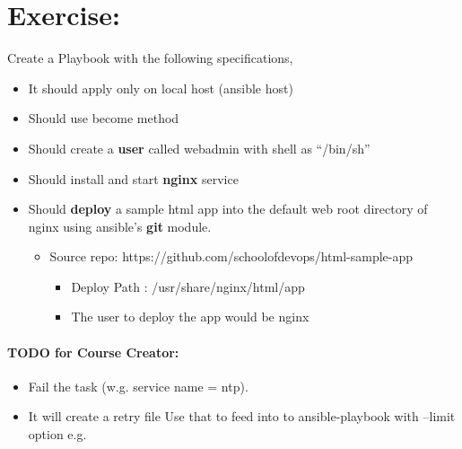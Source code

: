 \section{Exercise:}

Create a Playbook with the following specifications,

\begin{itemize}
\item It should apply only on local host (ansible host)
\item Should use become method
\item Should create a \textbf{user} called webadmin with shell as ``/bin/sh''
\item Should install and start \textbf{nginx} service
\item Should \textbf{deploy} a sample html app into the default web root directory of nginx using ansible's \textbf{git} module.


\begin{itemize}
\item Source repo:
https://github.com/schoolofdevops/html-sample-app


\begin{itemize}
\item Deploy Path : /usr/share/nginx/html/app
\item The user to deploy the app would be nginx
\end{itemize}
\end{itemize}
\end{itemize}

\paragraph{\textbf{TODO for Course Creator:}}

\begin{itemize}
\item Fail the task (w.g. service name = ntp).  
\item It will create a retry file\newline
   Use that to feed into to ansible-playbook with --limit option\newline
   e.g.\newline
\end{itemize}